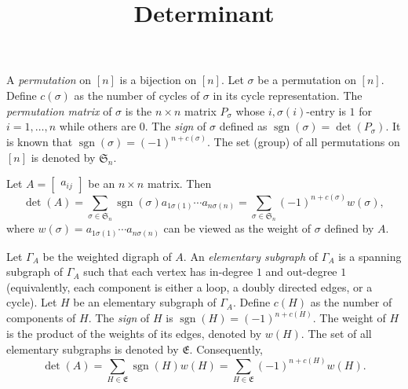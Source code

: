\documentclass{article}
\title{Determinant}
\date{\vspace{-1cm}}
\newcommand{\sgn}{\operatorname{sgn}}
\theoremstyle{definition}
\begin{document}
\maketitle
\large

A \emph{permutation} on $[n]$ is a bijection on $[n]$.  Let $\sigma$ be a permutation on $[n]$.  Define $c(\sigma)$ as the number of cycles of $\sigma$ in its cycle representation.  
The \emph{permutation matrix} of $\sigma$ is the $n\times n$ matrix $P_\sigma$ whose $i,\sigma(i)$-entry is $1$ for $i = 1,\ldots, n$ while others are $0$.  The \emph{sign} of $\sigma$ defined as $\sgn(\sigma) = \det(P_\sigma)$.  It is known that $\sgn(\sigma) = (-1)^{n + c(\sigma)}$.  The set (group) of all permutations on $[n]$ is denoted by $\mathfrak{S}_n$.

Let $A = \begin{bmatrix} a_{ij} \end{bmatrix}$ be an $n\times n$ matrix.  Then 
\[\det(A) = 
\sum_{\sigma\in\mathfrak{S}_n} \sgn(\sigma)a_{1\sigma(1)}\cdots a_{n\sigma(n)} = 
\sum_{\sigma\in\mathfrak{S}_n} (-1)^{n+c(\sigma)}w(\sigma),\]
where $w(\sigma) = a_{1\sigma(1)}\cdots a_{n\sigma(n)}$ can be viewed as the weight of $\sigma$ defined by $A$.

Let $\Gamma_A$ be the weighted digraph of $A$.  An \emph{elementary subgraph} of $\Gamma_A$ is a spanning subgraph of $\Gamma_A$ such that each vertex has in-degree $1$ and out-degree $1$ (equivalently, each component is either a loop, a doubly directed edges, or a cycle).  Let $H$ be an elementary subgraph of $\Gamma_A$.  Define $c(H)$ as the number of components of $H$.  The \emph{sign} of $H$ is $\sgn(H) = (-1)^{n+c(H)}$.  The weight of $H$ is the product of the weights of its edges, denoted by $w(H)$.  
The set of all elementary subgraphs is denoted by $\mathfrak{E}$.  Consequently, 
\[\det(A) = \sum_{H\in\mathfrak{E}} \sgn(H)w(H) = \sum_{H\in\mathfrak{E}}(-1)^{n+c(H)}w(H).\]
\end{document}
